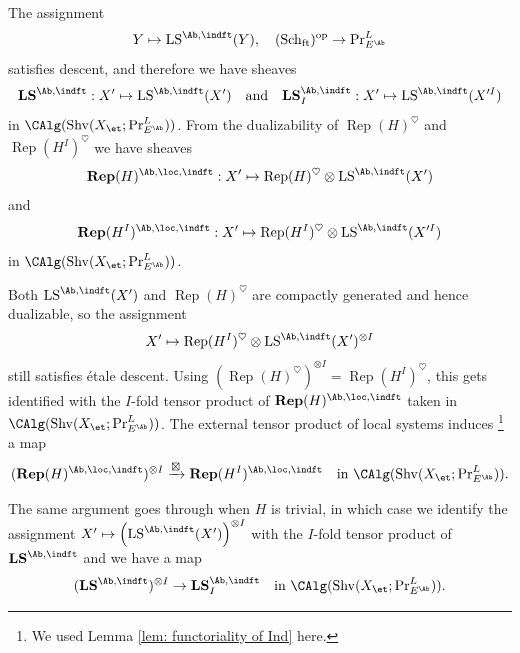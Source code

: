 \documentclass[10pt]{amsart}
\theoremstyle{remark}
\newcommand{\te}{\text}
\newcommand{\on}{\operatorname}
\newcommand{\Rep}{\on{Rep}}
\newcommand{\Shv}{\on{Shv}}
\newcommand{\LS}{\on{LS}}
\newcommand{\Schft}{\on{Sch}_{\on{ft}}}
\DeclareMathOperator{\op}{op}
\begin{document}
The assignment
\[Y\mapsto \LS^{\Ab,\indft}(Y),\quad (\Schft)^{\op}\rightarrow \on{Pr}^L_{E^{\Ab}}\]
satisfies descent, and therefore we have sheaves
\[\mathbf{LS}^{\Ab,\indft}: X'\mapsto \LS^{\Ab,\indft}(X') \quad \te{and}\quad \mathbf{LS}^{\Ab,\indft}_I: X'\mapsto \LS^{\Ab,\indft}(X'^I)\]
in $\CAlg(\Shv(X_{\et};\Pr^L_{E^{\Ab}}))$. From the dualizability of $\Rep(H)^{\heartsuit}$ and $\Rep(H^I)^{\heartsuit}$ we have sheaves
\begin{equation}\label{eq: Rep H indft}
    \textbf{Rep}(H)^{\Ab,\loc,\indft}: X'\mapsto \Rep(H)^{\heartsuit}\otimes \LS^{\Ab,\indft}(X')
\end{equation}
and
\begin{equation}\label{eq: Rep H indft I}
    \textbf{Rep}(H^I)^{\Ab,\loc,\indft}: X'\mapsto \Rep(H^I)^{\heartsuit}\otimes \LS^{\Ab,\indft}(X'^I)
\end{equation}
in $\CAlg(\Shv(X_{\et};\Pr^L_{E^{\Ab}}))$.
\medskip

Both $\LS^{\Ab,\indft}(X')$ and $\Rep(H)^{\heartsuit}$ are compactly generated and hence dualizable, so the assignment
\[X'\mapsto \Rep(H^I)^{\heartsuit}\otimes\LS^{\Ab,\indft}(X')^{\otimes I}\]
still satisfies \'etale descent. Using $(\Rep(H)^{\heartsuit})^{\otimes I}=\Rep(H^I)^{\heartsuit}$, this gets identified with the $I$-fold tensor product of $\mathbf{Rep}(H)^{\Ab,\loc,\indft}$ taken in $\CAlg(\Shv(X_{\et};\Pr^L_{E^{\Ab}}))$.
The external tensor product of local systems induces \footnote{We used Lemma \ref{lem: functoriality of Ind} here.} a map
\begin{equation}\label{eq: external product indft}
    (\mathbf{Rep}(H)^{\Ab,\loc,\indft})^{\otimes I}\xrightarrow{\boxtimes} \mathbf{Rep}(H^I)^{\Ab,\loc,\indft}\quad \te{in }\CAlg(\Shv(X_{\et};\on{Pr}^L_{E^{\Ab}})).
\end{equation}

The same argument goes through when $H$ is trivial, in which case we identify the assignment $X'\mapsto \left(\LS^{\Ab,\indft}(X')\right)^{\otimes I}$ with the $I$-fold tensor product of $\mathbf{LS}^{\Ab,\indft}$ and we have a map
\begin{equation}\label{eq: ext tensor prod LS indft}
    (\mathbf{LS}^{\Ab,\indft})^{\otimes I}\rightarrow \mathbf{LS}^{\Ab,\indft}_I \quad \te{in }\CAlg(\Shv(X_{\et};\on{\Pr}^L_{E^{\Ab}})).
\end{equation}
\end{document}
